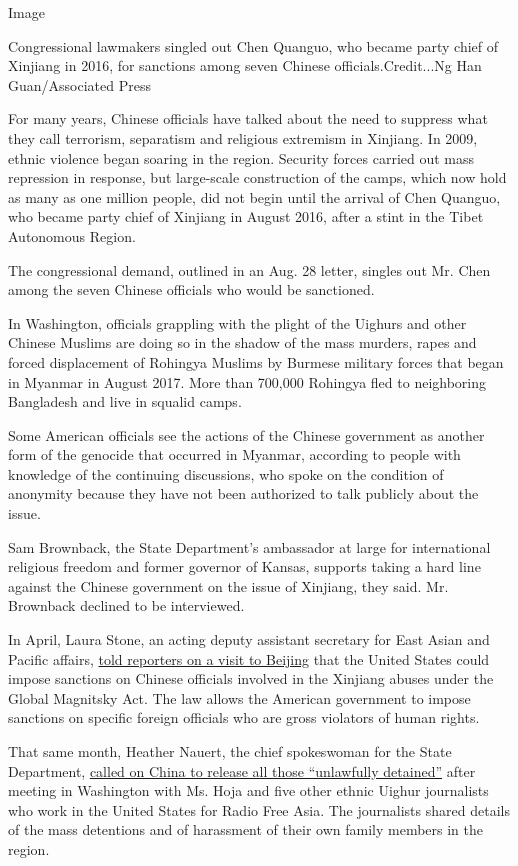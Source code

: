 Image

Congressional lawmakers singled out Chen Quanguo, who became party chief
of Xinjiang in 2016, for sanctions among seven Chinese
officials.Credit...Ng Han Guan/Associated Press

For many years, Chinese officials have talked about the need to suppress
what they call terrorism, separatism and religious extremism in
Xinjiang. In 2009, ethnic violence began soaring in the region. Security
forces carried out mass repression in response, but large-scale
construction of the camps, which now hold as many as one million people,
did not begin until the arrival of Chen Quanguo, who became party chief
of Xinjiang in August 2016, after a stint in the Tibet Autonomous
Region.

The congressional demand, outlined in an Aug. 28 letter, singles out Mr.
Chen among the seven Chinese officials who would be sanctioned.

In Washington, officials grappling with the plight of the Uighurs and
other Chinese Muslims are doing so in the shadow of the mass murders,
rapes and forced displacement of Rohingya Muslims by Burmese military
forces that began in Myanmar in August 2017. More than 700,000 Rohingya
fled to neighboring Bangladesh and live in squalid camps.

Some American officials see the actions of the Chinese government as
another form of the genocide that occurred in Myanmar, according to
people with knowledge of the continuing discussions, who spoke on the
condition of anonymity because they have not been authorized to talk
publicly about the issue.

Sam Brownback, the State Department's ambassador at large for
international religious freedom and former governor of Kansas, supports
taking a hard line against the Chinese government on the issue of
Xinjiang, they said. Mr. Brownback declined to be interviewed.

In April, Laura Stone, an acting deputy assistant secretary for East
Asian and Pacific affairs,
\href{https://www.apnews.com/13ee0b95c05249a8be7c0467bf413b6e}{told
reporters on a visit to Beijing} that the United States could impose
sanctions on Chinese officials involved in the Xinjiang abuses under the
Global Magnitsky Act. The law allows the American government to impose
sanctions on specific foreign officials who are gross violators of human
rights.

That same month, Heather Nauert, the chief spokeswoman for the State
Department,
\href{https://twitter.com/statedeptspox/status/987687844520001537}{called
on China to release all those ``unlawfully detained''} after meeting in
Washington with Ms. Hoja and five other ethnic Uighur journalists who
work in the United States for Radio Free Asia. The journalists shared
details of the mass detentions and of harassment of their own family
members in the region.

